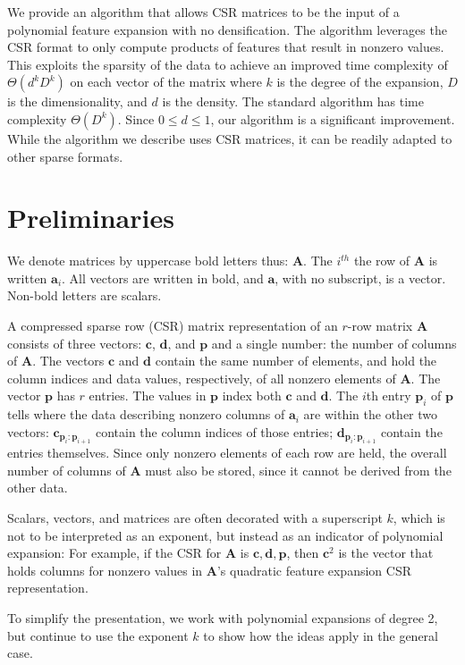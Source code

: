 \documentclass{article}
\begin{document}
We provide an algorithm that allows CSR matrices to be the input of a polynomial feature expansion with no densification.
The algorithm leverages the CSR format to only compute products of features that result in nonzero values.
This exploits the sparsity of the data to achieve an improved time complexity of $\Theta(d^kD^k)$ on each vector of the matrix where $k$ is the degree of the expansion, $D$ is the dimensionality, and $d$ is the density.
The standard algorithm has time complexity $\Theta(D^k)$.
Since $0 \le d \le 1$, our algorithm is a significant improvement.
While the algorithm we describe uses CSR matrices, it can be readily adapted to other sparse formats.

\section{Preliminaries}
We denote matrices by uppercase bold letters thus: $\bm{A}$. 
The $i^{th}$ the row of $\bm{A}$ is written $\bm{a}_i$. All vectors are written in bold, and  $\bm{a}$, with no subscript, is a vector. Non-bold letters are scalars. 

A compressed sparse row (CSR) matrix representation of an $r$-row matrix $\bm{A}$ consists of three vectors: $\bm{c}$, $\bm{d}$, and $\bm{p}$ and a single number: the number of columns of $\bm{A}$. The vectors
$\bm{c}$ and $\bm{d}$ contain the same number of elements, and hold the column indices and data values, respectively, of all nonzero elements of $\bm{A}$.
The vector $\bm{p}$ has $r$ entries. The values in $\bm{p}$ index both $\bm{c}$ and $\bm{d}$. The $i$th entry $\bm{p}_i$ of $\bm{p}$ tells where
the data describing nonzero columns of $\bm{a}_i$ are within the other two vectors: $\bm{c}_{\bm{p}_i:\bm{p}_{i+1}}$ contain the column indices of those entries; $\bm{d}_{\bm{p}_i:\bm{p}_{i+1}}$ contain the entries themselves.
Since only nonzero elements of each row are held, the overall number of columns of $\bm{A}$  must also be stored, since it cannot be derived
from the other data.

Scalars, vectors, and matrices are often decorated with a superscript $k$, which is not to be interpreted as an exponent, but instead as an indicator of polynomial expansion: 
For example, if the CSR for $\bm{A}$ is $\bm{c}, \bm{d}, \bm{p}$, then $\bm{c}^2$ is the vector that holds columns for nonzero values in $\bm{A}$'s quadratic feature expansion CSR representation.

To simplify the presentation, we work with polynomial expansions of degree 2, but continue to use the exponent $k$ to show how the ideas apply in the general case.
\end{document}
